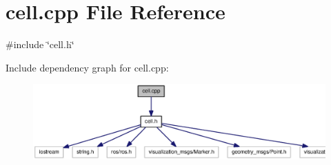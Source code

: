 \section{cell.cpp File Reference}
\label{cell_8cpp}
{\ttfamily \#include \char`\"{}cell.h\char`\"{}}\par
Include dependency graph for cell.cpp:
\nopagebreak
\begin{figure}[H]
\begin{center}
\leavevmode
\includegraphics[width=400pt]{cell_8cpp__incl}
\end{center}
\end{figure}
